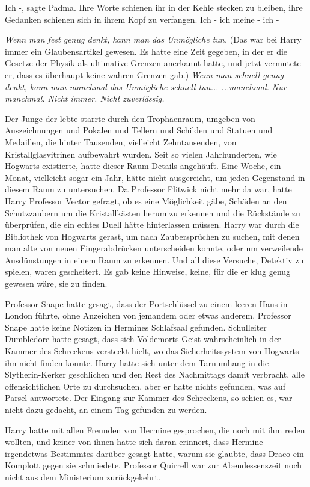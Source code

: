 \glqq{}Ich -\grqq{}, sagte Padma. Ihre Worte schienen ihr in der Kehle stecken zu
bleiben, ihre Gedanken schienen sich in ihrem Kopf zu verfangen. \glqq{}Ich - ich
meine - ich -\grqq{}

\emph{Wenn man fest genug denkt, kann man das Unmögliche tun.}
(Das war bei Harry immer ein Glaubensartikel gewesen. Es hatte eine Zeit
gegeben, in der er die Gesetze der Physik als ultimative Grenzen anerkannt
hatte, und jetzt vermutete er, dass es überhaupt keine wahren Grenzen gab.)
\emph{Wenn man schnell genug denkt, kann man manchmal das Unmögliche schnell
tun... ...manchmal. Nur manchmal. Nicht immer. Nicht zuverlässig.}

Der Junge-der-lebte starrte durch den Trophäenraum, umgeben von Auszeichnungen
und Pokalen und Tellern und Schilden und Statuen und Medaillen, die hinter
Tausenden, vielleicht Zehntausenden, von Kristallglasvitrinen aufbewahrt wurden.
Seit so vielen Jahrhunderten, wie Hogwarts existierte, hatte dieser Raum Details
angehäuft. Eine Woche, ein Monat, vielleicht sogar ein Jahr, hätte nicht
ausgereicht, um jeden Gegenstand in diesem Raum zu untersuchen. Da Professor
Flitwick nicht mehr da war, hatte Harry Professor Vector gefragt, ob es eine
Möglichkeit gäbe, Schäden an den Schutzzaubern um die Kristallkästen herum zu
erkennen und die Rückstände zu überprüfen, die ein echtes Duell hätte
hinterlassen müssen. Harry war durch die Bibliothek von Hogwarts gerast, um nach
Zaubersprüchen zu suchen, mit denen man alte von neuen Fingerabdrücken
unterscheiden konnte, oder um verweilende Ausdünstungen in einem Raum zu
erkennen. Und all diese Versuche, Detektiv zu spielen, waren gescheitert. Es gab
keine Hinweise, keine, für die er klug genug gewesen wäre, sie zu finden.

Professor Snape hatte gesagt, dass der Portschlüssel zu einem leeren Haus in
London führte, ohne Anzeichen von jemandem oder etwas anderem. Professor Snape
hatte keine Notizen in Hermines Schlafsaal gefunden. Schulleiter Dumbledore
hatte gesagt, dass sich Voldemorts Geist wahrscheinlich in der Kammer des
Schreckens versteckt hielt, wo das Sicherheitssystem von Hogwarts ihn nicht
finden konnte. Harry hatte sich unter dem Tarnumhang in die Slytherin-Kerker
geschlichen und den Rest des Nachmittags damit verbracht, alle offensichtlichen
Orte zu durchsuchen, aber er hatte nichts gefunden, was auf Parsel antwortete.
Der Eingang zur Kammer des Schreckens, so schien es, war nicht dazu gedacht, an
einem Tag gefunden zu werden.

Harry hatte mit allen Freunden von Hermine gesprochen, die noch mit ihm reden
wollten, und keiner von ihnen hatte sich daran erinnert, dass Hermine
irgendetwas Bestimmtes darüber gesagt hatte, warum sie glaubte, dass Draco ein
Komplott gegen sie schmiedete. Professor Quirrell war zur Abendessenszeit noch
nicht aus dem Ministerium zurückgekehrt.

